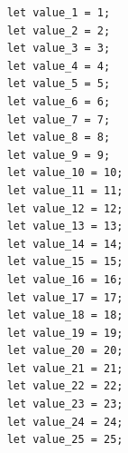 \documentclass{article}
\begin{document}
\begin{Verbatim}
    let value_1 = 1;
    let value_2 = 2;
    let value_3 = 3;
    let value_4 = 4;
    let value_5 = 5;
    let value_6 = 6;
    let value_7 = 7;
    let value_8 = 8;
    let value_9 = 9;
    let value_10 = 10;
    let value_11 = 11;
    let value_12 = 12;
    let value_13 = 13;
    let value_14 = 14;
    let value_15 = 15;
    let value_16 = 16;
    let value_17 = 17;
    let value_18 = 18;
    let value_19 = 19;
    let value_20 = 20;
    let value_21 = 21;
    let value_22 = 22;
    let value_23 = 23;
    let value_24 = 24;
    let value_25 = 25;
\end{Verbatim}
\end{document}
